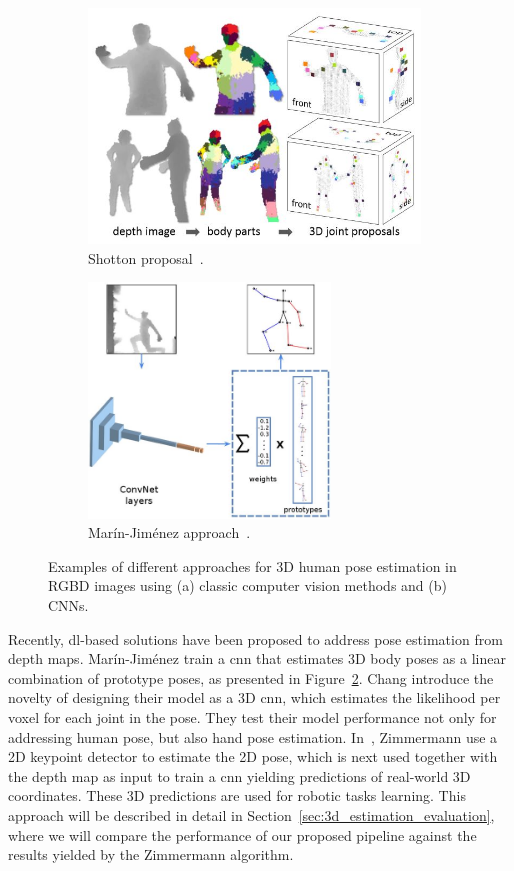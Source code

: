 \begin{figure}[h]\centering
    \begin{subfigure}{0.55\textwidth}\centering
        \includegraphics[height=6.25cm]{figures/shotton.JPG} 
        \caption{Shotton \etal proposal~\cite{shotton2011real}.}
        \label{subfig:shotton}
    \end{subfigure}
    \begin{subfigure}{0.44\textwidth}\centering
        \includegraphics[height=6.25cm]{figures/marin_jimenez_adapted.JPG}
        \caption{Marín-Jiménez \etal approach~\cite{Marin-Jimenez2018-so}.}
        \label{subfig:marin}
    \end{subfigure}
    \caption{Examples of different approaches for 3D human pose estimation in RGBD images using (a) classic computer vision methods and (b) CNNs.}
    \label{fig:3d_from_rgbd}
\end{figure}

Recently, \gls{dl}-based solutions have been proposed to address pose estimation from depth maps. Marín-Jiménez \etal\cite{Marin-Jimenez2018-so} train a \gls{cnn} that estimates 3D body poses as a linear combination of prototype poses, as presented in Figure~\ref{subfig:marin}. Chang \etal\cite{Chang2018} introduce the novelty of designing their model as a 3D \gls{cnn}, which estimates the likelihood per voxel for each joint in the pose. They test their model performance not only for addressing human pose, but also hand pose estimation. In~\cite{Zimmermann2018-sn}, Zimmermann \etal use a 2D keypoint detector to estimate the 2D pose, which is next used together with the depth map as input to train a \gls{cnn} yielding predictions of real-world 3D coordinates. These 3D predictions are used for robotic tasks learning. This approach will be described in detail in Section~\ref{sec:3d_estimation_evaluation}, where we will compare the performance of our proposed pipeline against the results yielded by the Zimmermann \etal algorithm.